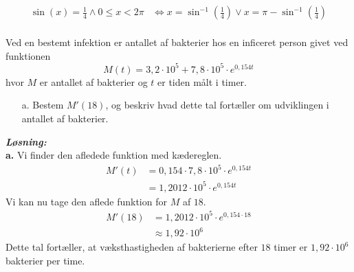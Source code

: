 \documentclass{article}
\newcommand{\sol}{\setlength{\parindent}{0cm}\textbf{\textit{Løsning:}}\setlength{\parindent}{1cm}}
\begin{document}
\begin{equation*}
\begin{split}
  \sin(x)=\frac{1}{4} \land 0\leq x < 2\pi &\iff x=\sin^{-1}\left(\frac{1}{4}\right) \lor x=\pi -\sin^{-1}\left(\frac{1}{4}\right) \\
\end{split}
\end{equation*}
\begin{question}{}{}
  Ved en bestemt infektion er antallet af bakterier hos en inficeret person givet ved funktionen 
  \[
  M(t)=3,2 \cdot 10^5 + 7,8\cdot 10^5 \cdot e^{0,154t}
  \] 
hvor $M$ er antallet af bakterier og $t$ er tiden målt i timer. 
\begin{itemize}
  \item[a.] Bestem $M'(18)$, og beskriv hvad dette tal fortæller om udviklingen i antallet af bakterier.
\end{itemize}
\end{question}
\sol \\ 
\textbf{a.} Vi finder den afledede funktion med kædereglen.
\begin{equation*}
\begin{split}
  M'(t)&=0,154 \cdot 7,8 \cdot 10^5 \cdot e^{0,154t}\\ 
  &=1,2012 \cdot 10^5 \cdot e^{0,154t}
\end{split}
\end{equation*}
Vi kan nu tage den aflede funktion for $M$ af $18$.
\begin{equation*}
\begin{split}
  M'(18)&=1,2012 \cdot 10^5 \cdot e^{0,154\cdot 18}\\ 
  &\approx 1,92 \cdot 10^6
\end{split}
\end{equation*}
Dette tal fortæller, at væksthastigheden af bakterierne efter $18$ timer er $1,92 \cdot 10^6$ bakterier per time.
\end{document}
